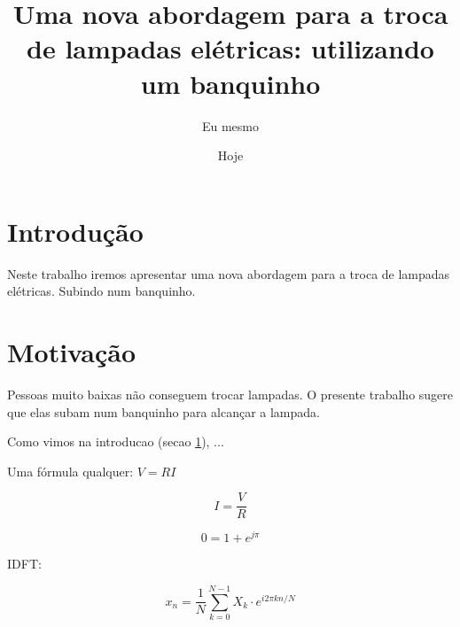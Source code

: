 \documentclass{article}
\author{Eu mesmo}
\date{Hoje}
\title{Uma nova abordagem para a troca de
       lampadas elétricas: utilizando um banquinho}
\begin{document}
\maketitle

\newpage

\section{Introdução}
\label{sec:intro}

Neste trabalho  iremos apresentar uma nova abordagem
para a troca  de lampadas elétricas.
Subindo  num  banquinho. %


\section{Motivação}
\label{sec:motiv}

Pessoas muito baixas não conseguem trocar lampadas.
O presente trabalho sugere que elas subam num
banquinho para alcançar a lampada.

Como vimos na introducao (secao \ref{sec:intro}),
...

Uma fórmula qualquer: $V=R I$

$$I = \frac{V}{R}$$

$$0=1+e^{j\pi}$$

IDFT:

$$x_n = \frac{1}{N}
\sum_{k=0}^{N-1} X_k \cdot
e^{i2\pi kn/N}
$$
\end{document}
